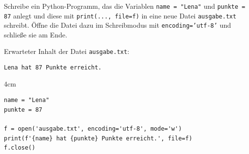 \question[4]
Schreibe ein Python-Programm, das die Variablen \texttt{name = "Lena"} und
\texttt{punkte = 87} anlegt und diese mit \texttt{print(..., file=f)} in eine neue
Datei \texttt{ausgabe.txt} schreibt. Öffne die Datei dazu im Schreibmodus mit
\texttt{encoding='utf-8'} und schließe sie am Ende.

Erwarteter Inhalt der Datei \texttt{ausgabe.txt}:
\begin{lstlisting}
Lena hat 87 Punkte erreicht.
\end{lstlisting}

\begin{solutionbox}{4cm}
\begin{lstlisting}
name = "Lena"
punkte = 87

f = open('ausgabe.txt', encoding='utf-8', mode='w')
print(f'{name} hat {punkte} Punkte erreicht.', file=f)
f.close()
\end{lstlisting}
\end{solutionbox}